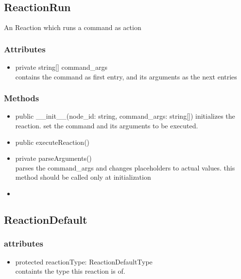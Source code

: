 \subsection{ReactionRun}
	An Reaction which runs a command as action 
\subsubsection{Attributes}
\begin{itemize}
	\item private string[] command\_args
	\\ contains the command as first entry, and its arguments as the next entries
\end{itemize}
\subsubsection{Methods}
\begin{itemize}
	\item public \_\_init\_\_(node\_id: string, command\_args: string[])
		initializes the reaction. set the command and its arguments to be executed.
	\item public executeReaction()\\
	\item private parseArguments()\\
		parses the command\_args and changes placeholders to actual values. this method should be called only at initialization
	\item 
\end{itemize}


\subsection{ReactionDefault}
\subsubsection{attributes}
\begin{itemize}
	\item protected reactionType: ReactionDefaultType\\
		containts the type this reaction is of.
\end{itemize}
